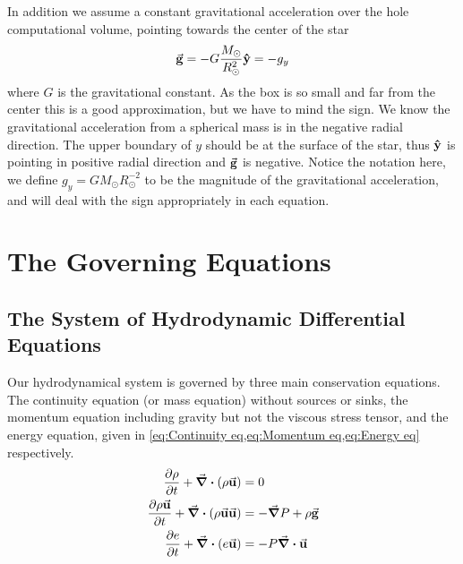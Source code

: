 \documentclass[11pt,a4paper,twocolumn,titlepage]{article}
\begin{document}
In addition we assume a constant gravitational acceleration over the hole computational volume, pointing towards the center of the star
\begin{equation*}
\va{g} = -G\frac{M_\odot}{R_\odot^2}\vu{y} =- g_y \label{eq:Gravitational acceleration}
\end{equation*}
where $G$ is the gravitational constant. As the box is so small and far from the center this is a good approximation, but we have to mind the sign. We know the gravitational acceleration from a spherical mass is in the negative radial direction. The upper boundary of $y$ should be at the surface of the star, thus $\vu{y}$ is pointing in positive radial direction and $\va{g}$ is negative. Notice the notation here, we define $g_y = GM_\odot R_\odot^{-2}$ to be the magnitude of the gravitational acceleration, and will deal with the sign appropriately in each equation.


\section{The Governing Equations}\label{sec:Governing eqs}

\subsection{The System of Hydrodynamic Differential Equations}\label{subsec:Gov/Hydrodynamic eqs.}
Our hydrodynamical system is governed by three main conservation equations. The continuity equation (or mass equation) without sources or sinks, the momentum equation including gravity but not the viscous stress tensor, and the energy equation, given in \cref{eq:Continuity eq,eq:Momentum eq,eq:Energy eq} respectively.
\begin{align}
\pdv{\rho}{t} + \div(\rho \va{u}) &= 0
\label{eq:Continuity eq}
\\
\pdv{\rho\va{u}}{t} + \div(\rho\va{u}\va{u}) &= - \grad{P}+\rho \va{g}
\label{eq:Momentum eq}
\\
\pdv{e}{t} + \div(e\va{u}) &= -P\div{\va{u}}
\label{eq:Energy eq}
\end{align}
\end{document}

